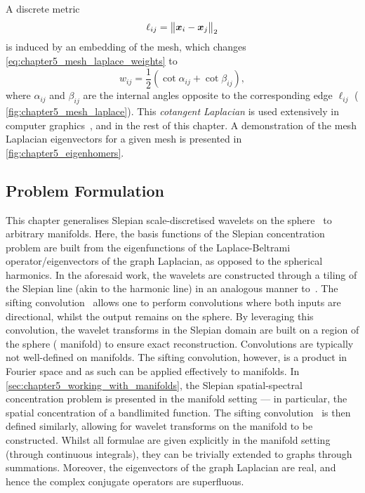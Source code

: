 A discrete metric
%
\begin{equation}
	\ell_{i j}
	= {\big\lVert\vb*{x}_{i} - \vb*{x}_{j}\big\rVert}_{2}
\end{equation}
%
is induced by an embedding of the mesh, which changes \cref{eq:chapter5_mesh_laplace_weights} to
%
\begin{equation}
	w_{i j}
	= \frac{1}{2}(\cot{\alpha_{i j}} + \cot{\beta_{i j}}),
\end{equation}
%
where \(\alpha_{i j}\) and \(\beta_{i j}\) are the internal angles opposite to the corresponding edge \(\ell_{i j}\) (\cf{} \cref{fig:chapter5_mesh_laplace}).
This \emph{cotangent Laplacian} is used extensively in computer graphics~\cite{Pinkall1993}, and in the rest of this chapter.
A demonstration of the mesh Laplacian eigenvectors for a given mesh is presented in \cref{fig:chapter5_eigenhomers}.





\subsection{Problem Formulation}\label{sec:chapter5_problem_formulation}

This chapter generalises Slepian scale-discretised wavelets on the sphere~\cite{Roddy2021a} to arbitrary manifolds.
Here, the basis functions of the Slepian concentration problem are built from the eigenfunctions of the Laplace-Beltrami operator/eigenvectors of the graph Laplacian, as opposed to the spherical harmonics.
In the aforesaid work, the wavelets are constructed through a tiling of the Slepian line (akin to the harmonic line) in an analogous manner to~\cite{Wiaux2008,McEwen2018}.
The sifting convolution~\cite{Roddy2021} allows one to perform convolutions where both inputs are directional, whilst the output remains on the sphere.
By leveraging this convolution, the wavelet transforms in the Slepian domain are built on a region of the sphere (\cf{} manifold) to ensure exact reconstruction.
Convolutions are typically not well-defined on manifolds.
The sifting convolution, however, is a product in Fourier space and as such can be applied effectively to manifolds.
In \cref{sec:chapter5_working_with_manifolds}, the Slepian spatial-spectral concentration problem is presented in the manifold setting --- in particular, the spatial concentration of a bandlimited function.
The sifting convolution~\cite{Roddy2021} is then defined similarly, allowing for wavelet transforms on the manifold to be constructed.
Whilst all formulae are given explicitly in the manifold setting (through continuous integrals), they can be trivially extended to graphs through summations.
Moreover, the eigenvectors of the graph Laplacian are real, and hence the complex conjugate operators are superfluous.

